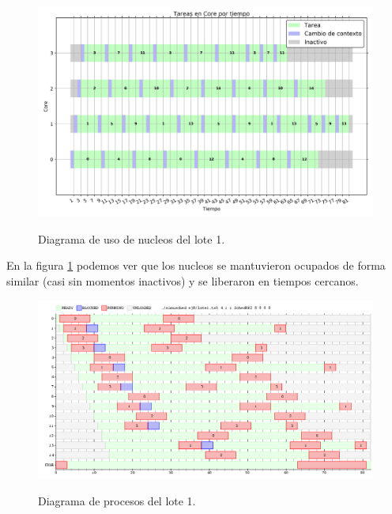 \begin{figure}[h]
  \centering
    \includegraphics[width=1\textwidth]{images/ej8/lote1_cores.png}
  \label{fig: lote8_1_cores}
  \caption{Diagrama de uso de nucleos del lote 1.}
\end{figure}

\par En la figura \ref{fig: lote8_1_cores} podemos ver que los nucleos se mantuvieron ocupados de forma similar (casi sin momentos inactivos) y se liberaron en tiempos cercanos.

\begin{figure}[h]
  \centering
    \includegraphics[width=1\textwidth]{images/ej8/lote1_sched.png}
  \label{fig: lote8_1_sched}
  \caption{Diagrama de procesos del lote 1.}
\end{figure}

